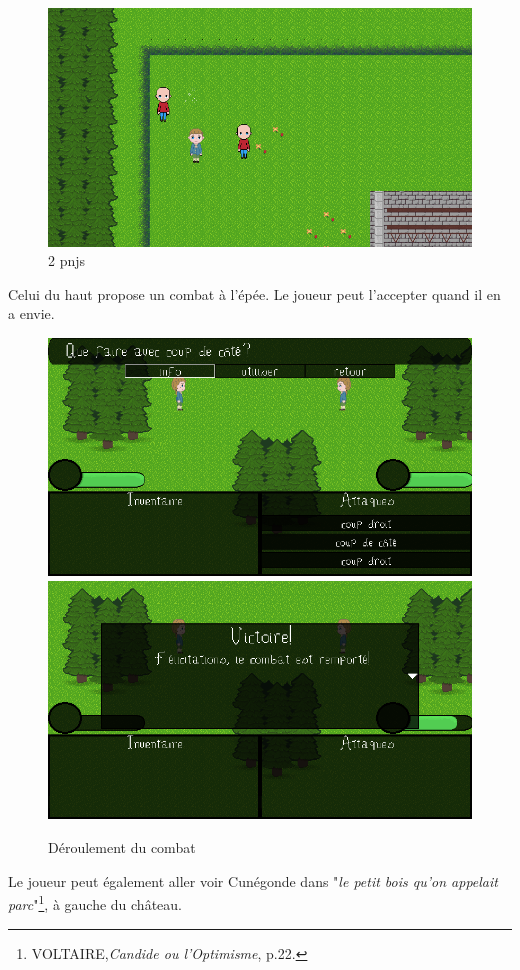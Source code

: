 \documentclass[11pt]{article}
\begin{document}
\begin{figure}[H]
\includegraphics[scale=0.28]{gameplay5}
\centering
\caption{2 pnjs}
\end{figure} 

Celui du haut propose un combat à l'épée. Le joueur peut l'accepter quand il en a envie. 

\begin{figure}[H]
\includegraphics[scale=0.30]{gameplay6}
\includegraphics[scale=0.30]{gameplay7}
\centering
\caption{Déroulement du combat}
\label{gagne}
\end{figure}
\newpage
Le joueur peut également aller voir Cunégonde dans "\textit{le petit bois qu'on appelait parc}"\footnote{VOLTAIRE,\textit{Candide ou l'Optimisme}, p.22.}, à gauche du château.
\end{document}

